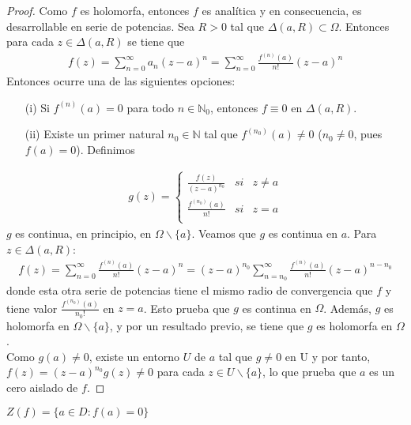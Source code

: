 \begin{proof}
Como $f$ es holomorfa, entonces $f$ es analítica y en consecuencia, es desarrollable en serie de potencias. Sea $R > 0$ tal que $\Delta(a,R) \subset \Omega$. Entonces para cada $z \in \Delta(a,R)$ se tiene que
\begin{align*}
    f(z) = \sum_{n=0}^{\infty}{a_n (z-a)^n} = \sum_{n=0}^{\infty}{\frac{f^{(n)}(a)}{n!} (z-a)^n}
\end{align*}
Entonces ocurre una de las siguientes opciones:
\begin{enumerate}
    \item[(i)] Si $f^{(n)}(a) = 0$ para todo $n \in \mathbb{N}_0$, entonces $f \equiv 0$ en $\Delta(a,R)$.
    \item[(ii)] Existe un primer natural $n_0 \in \mathbb{N}$ tal que $f^{(n_0)}(a) \not = 0$ ($n_0 \not = 0$, pues $f(a) = 0$). Definimos
\end{enumerate}
\begin{align*}
    g(z) = \left\{ \begin{array}{lcc}
             \frac{f(z)}{(z-a)^{n_0}} &  si  & z \not = a\\
             \frac{f^{(n_0)}(a)}{n!} &  si & z = a \\
             \end{array}
   \right.
\end{align*}
$g$ es continua, en principio, en $\Omega \backslash \{a\}$. Veamos que $g$ es continua en $a$. Para $z \in \Delta(a,R)$:
\begin{align*}
    f(z) = \sum_{n=0}^{\infty}{\frac{f^{(n)}(a)}{n!} (z-a)^n} = (z-a)^{n_0}\sum_{n=n_0}^{\infty}{\frac{f^{(n)}(a)}{n!} (z-a)^{n-n_0}}
\end{align*}
donde esta otra serie de potencias tiene el mismo radio de convergencia que $f$ y tiene valor $\frac{f^{(n_0)}(a)}{n_0!}$ en $z = a$. Esto prueba que $g$ es continua en $\Omega$. Además, $g$ es holomorfa en $\Omega \backslash \{a\}$, y por un resultado previo, se tiene que $g$ es holomorfa en $\Omega$.
\\
\newline
Como $g(a) \not = 0$, existe un entorno $U$ de $a$ tal que $g \not = 0$ en U y por tanto, $f(z) = (z-a)^{n_0}g(z) \not = 0$ para cada $z \in U \backslash \{a\}$, lo que prueba que $a$ es un cero aislado de $f$.
\end{proof}

\begin{defi}
$Z(f) = \{ a \in D : f(a) = 0\}$
\end{defi}

